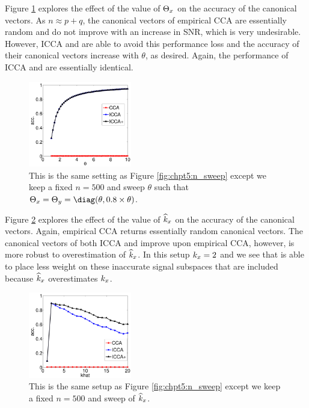 Figure \ref{fig:chpt5:theta_sweep} explores the effect of the value of $\Theta_x$ on the
accuracy of the canonical vectors. As $n\approx p+q$, the canonical vectors of empirical
CCA are essentially random and do not improve with an increase in SNR, which is very
undesirable. However, ICCA and \iccap are able to avoid this performance loss and the
accuracy of their canonical vectors increase with $\theta$, as desired. Again, the
performance of ICCA and \iccap are essentially identical. 

\begin{figure}
  \centering
  \includegraphics[width=0.4\textwidth]{chpt5_icca_vect/figs/asilomar_theta.pdf}  
  \caption{This is the same setting as Figure \ref{fig:chpt5:n_sweep} except we
    keep a fixed $n=500$ and sweep $\theta$ such that
    $\Tx=\Ty=\diag(\theta,0.8\times\theta)$. }
  \label{fig:chpt5:theta_sweep}
\end{figure}

Figure \ref{fig:chpt5:k_sweep} explores the effect of the value of $\widehat{k}_x$ on the
accuracy of the canonical vectors. Again, empirical CCA returns essentially random
canonical vectors. The canonical vectors of both ICCA and \iccap improve upon empirical
CCA, however, \iccap is more robust to overestimation of $\widehat{k}_x$. In this setup $k_x=2$
and we see that \iccap is able to place less weight on these inaccurate signal subspaces
that are included because $\widehat{k}_x$ overestimates $k_x$.

\begin{figure}
  \centering
  \includegraphics[width=0.4\textwidth]{chpt5_icca_vect/figs/khat_sweep.pdf}  
  \caption{This is the same setup as Figure \ref{fig:chpt5:n_sweep} except we keep a fixed
    $n=500$ and sweep of $\widehat{k}_x$.}
  \label{fig:chpt5:k_sweep}
\end{figure}

